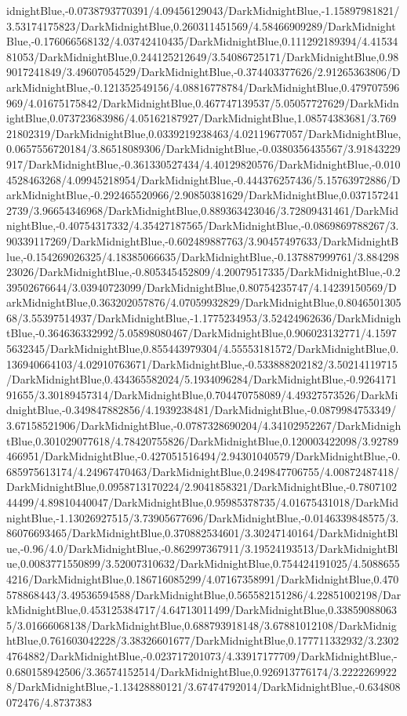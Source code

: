 {\begin{tikzternal}
idnightBlue,-0.0738793770391/4.09456129043/DarkMidnightBlue,-1.15897981821/3.53174175823/DarkMidnightBlue,0.260311451569/4.58466909289/DarkMidnightBlue,-0.176066568132/4.03742410435/DarkMidnightBlue,0.111292189394/4.4153481053/DarkMidnightBlue,0.244125212649/3.54086725171/DarkMidnightBlue,0.989017241849/3.49607054529/DarkMidnightBlue,-0.374403377626/2.91265363806/DarkMidnightBlue,-0.121352549156/4.08816778784/DarkMidnightBlue,0.479707596969/4.01675175842/DarkMidnightBlue,0.467747139537/5.05057727629/DarkMidnightBlue,0.073723683986/4.05162187927/DarkMidnightBlue,1.08574383681/3.76921802319/DarkMidnightBlue,0.0339219238463/4.02119677057/DarkMidnightBlue,0.0657556720184/3.86518089306/DarkMidnightBlue,-0.0380356435567/3.91843229917/DarkMidnightBlue,-0.361330527434/4.40129820576/DarkMidnightBlue,-0.0104528463268/4.09945218954/DarkMidnightBlue,-0.444376257436/5.15763972886/DarkMidnightBlue,-0.292465520966/2.90850381629/DarkMidnightBlue,0.0371572412739/3.96654346968/DarkMidnightBlue,0.889363423046/3.72809431461/DarkMidnightBlue,-0.40754317332/4.35427187565/DarkMidnightBlue,-0.0869869788267/3.90339117269/DarkMidnightBlue,-0.602489887763/3.90457497633/DarkMidnightBlue,-0.154269026325/4.18385066635/DarkMidnightBlue,-0.137887999761/3.88429823026/DarkMidnightBlue,-0.805345452809/4.20079517335/DarkMidnightBlue,-0.239502676644/3.03940723099/DarkMidnightBlue,0.80754235747/4.14239150569/DarkMidnightBlue,0.363202057876/4.07059932829/DarkMidnightBlue,0.804650130568/3.55397514937/DarkMidnightBlue,-1.1775234953/3.52424962636/DarkMidnightBlue,-0.364636332992/5.05898080467/DarkMidnightBlue,0.906023132771/4.15975632345/DarkMidnightBlue,0.855443979304/4.55553181572/DarkMidnightBlue,0.136940664103/4.02910763671/DarkMidnightBlue,-0.533888202182/3.50214119715/DarkMidnightBlue,0.434365582024/5.1934096284/DarkMidnightBlue,-0.926417191655/3.30189457314/DarkMidnightBlue,0.704470758089/4.49327573526/DarkMidnightBlue,-0.349847882856/4.1939238481/DarkMidnightBlue,-0.0879984753349/3.67158521906/DarkMidnightBlue,-0.0787328690204/4.34102952267/DarkMidnightBlue,0.301029077618/4.78420755826/DarkMidnightBlue,0.120003422098/3.92789466951/DarkMidnightBlue,-0.427051516494/2.94301040579/DarkMidnightBlue,-0.685975613174/4.24967470463/DarkMidnightBlue,0.249847706755/4.00872487418/DarkMidnightBlue,0.0958713170224/2.9041858321/DarkMidnightBlue,-0.780710244499/4.89810440047/DarkMidnightBlue,0.95985378735/4.01675431018/DarkMidnightBlue,-1.13026927515/3.73905677696/DarkMidnightBlue,-0.0146339848575/3.86076693465/DarkMidnightBlue,0.370882534601/3.30247140164/DarkMidnightBlue,-0.96/4.0/DarkMidnightBlue,-0.862997367911/3.19524193513/DarkMidnightBlue,0.0083771550899/3.52007310632/DarkMidnightBlue,0.754424191025/4.50886554216/DarkMidnightBlue,0.186716085299/4.07167358991/DarkMidnightBlue,0.470578868443/3.49536594588/DarkMidnightBlue,0.565582151286/4.22851002198/DarkMidnightBlue,0.453125384717/4.64713011499/DarkMidnightBlue,0.338590880635/3.01666068138/DarkMidnightBlue,0.688793918148/3.67881012108/DarkMidnightBlue,0.761603042228/3.38326601677/DarkMidnightBlue,0.177711332932/3.23024764882/DarkMidnightBlue,-0.023717201073/4.33917177709/DarkMidnightBlue,-0.680158942506/3.36574152514/DarkMidnightBlue,0.926913776174/3.22222699228/DarkMidnightBlue,-1.13428880121/3.67474792014/DarkMidnightBlue,-0.634808072476/4.8737383
\end{tikzternal}}
